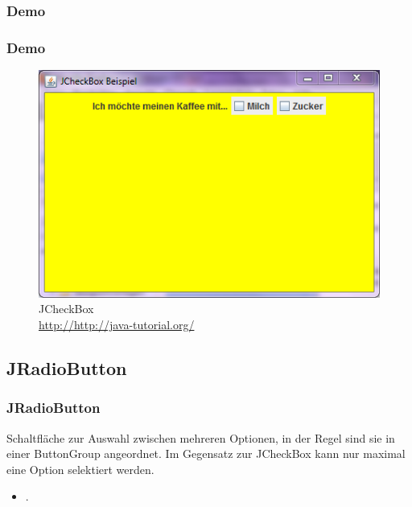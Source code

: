 \documentclass[xcolor=dvipsnames]{beamer}
\begin{document}
\subsubsection{Demo}
\begin{frame}
  \frametitle{Demo}
	\begin{figure}
		\includegraphics[scale=0.8]{images/jcheckbox.PNG}
		\caption{JCheckBox \\ \tiny{\textcolor{gray}{\url{http://http://java-tutorial.org/}}}}
		\end{figure}
\end{frame}


\subsection{JRadioButton}
\begin{frame} %
  \frametitle{JRadioButton} %
  \begin{block}{Schaltfläche zur Auswahl zwischen mehreren Optionen, in der Regel sind sie in einer ButtonGroup angeordnet. Im Gegensatz zur JCheckBox kann nur maximal eine Option selektiert werden.}
	  \begin{itemize}
		\item .
	  \end{itemize}
  \end{block}
\end{frame}
\end{document}
